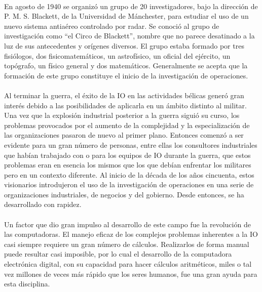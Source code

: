 \documentclass[12pt, a4paper,spanish]{article}
\begin{document}
		\paragraph{}
		En agosto de 1940 se organizó un grupo de 20 investigadores, bajo la dirección de P. M. S. Blackett, de la Universidad de Mánchester, para estudiar el uso de un nuevo sistema antiaéreo controlado por radar. Se conoció al grupo de investigación como “el Circo de Blackett”, nombre que no parece desatinado a la luz de sus antecedentes y orígenes diversos. El grupo estaba formado por tres fisiólogos, dos fisicomatemáticos, un astrofísico, un oficial del ejército, un topógrafo, un físico general y dos matemáticos. Generalmente se acepta que la formación de este grupo constituye el inicio de la investigación de operaciones. \cite{wikipedia_IO}

		\paragraph{}
		Al terminar la guerra, el éxito de la IO en las actividades bélicas generó gran interés debido a las posibilidades de aplicarla en un ámbito distinto al militar. Una vez que la explosión industrial posterior a la guerra siguió su curso, los problemas provocados por el aumento de la complejidad y la especialización de las organizaciones pasaron de nuevo al primer plano. Entonces comenzó a ser evidente para un gran número de personas, entre ellas los consultores industriales que habían trabajado con o para los equipos de IO durante la guerra, que estos problemas eran en esencia los mismos que los que debían enfrentar los militares pero en un contexto diferente. Al inicio de la década de los años cincuenta, estos visionarios introdujeron el uso de la investigación de operaciones en una serie de organizaciones industriales, de negocios y del gobierno. Desde entonces, se ha desarrollado con rapidez. \cite{hillier_lieberman_IO}

		\paragraph{}
		Un factor que dio gran impulso al desarrollo de este campo fue la revolución de las computadoras. El manejo eficaz de los complejos problemas inherentes a la IO casi siempre requiere un gran número de cálculos. Realizarlos de forma manual puede resultar casi imposible, por lo cual el desarrollo de la computadora electrónica digital, con su capacidad para hacer cálculos aritméticos, miles o tal vez millones de veces más rápido que los seres humanos, fue una gran ayuda para esta disciplina.	\cite{hillier_lieberman_IO}
\end{document}
